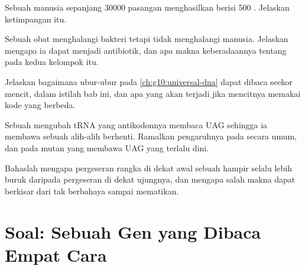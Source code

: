 \begin{exercise}[$\star\star$]\label{exo:g11:gene-expression:11}
Sebuah  manusia sepanjang \num{30000} pasangan  menghasilkan
 berisi 500 . Jelaskan ketimpangan itu.
\end{exercise}

\begin{exercise}[$\star\star\star$]\label{exo:g11:gene-expression:12}
Sebuah obat menghalangi  bakteri tetapi tidak menghalangi
 manusia. Jelaskan mengapa ia dapat menjadi antibiotik, dan apa
makna keberadaannya tentang  pada kedua kelompok itu.
\end{exercise}

\begin{exercise}[$\star\star\star$]\label{exo:g11:gene-expression:13}
Jelaskan bagaimana  ubur-ubur pada \cref{ch:g10:universal-dna} dapat
dibaca seekor mencit, dalam istilah bab ini, dan apa yang akan terjadi
jika mencitnya memakai kode yang berbeda.
\end{exercise}

\begin{exercise}[$\star\star\star$]\label{exo:g11:gene-expression:14}
Sebuah  mengubah tRNA yang antikodonnya membaca UAG sehingga ia
membawa sebuah  alih-alih berhenti. Ramalkan pengaruhnya pada
  secara umum, dan pada  mutan yang membawa UAG yang
terlalu dini.
\end{exercise}

\begin{exercise}[$\star\star\star$]\label{exo:g11:gene-expression:15}
Bahaslah mengapa pergeseran rangka di dekat awal sebuah  hampir
selalu lebih buruk daripada pergeseran di dekat ujungnya, dan mengapa
 salah makna dapat berkisar dari tak berbahaya sampai mematikan.
\end{exercise}

\section{Soal: Sebuah Gen yang Dibaca Empat Cara}

